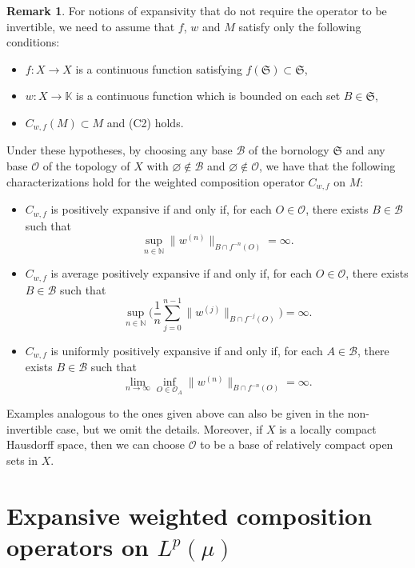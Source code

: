 \documentclass[12pt]{article}
\theoremstyle{plain}
\theoremstyle{definition}
\newtheorem{remark}[theorem]{Remark}%
\newcommand{\N}{\mathbb{N}} %
\newcommand{\K}{\mathbb{K}} %
\newcommand{\cB}{\mathcal{B}}
\newcommand{\cO}{\mathcal{O}}
\newcommand{\fS}{\mathfrak{S}}
\begin{document}
\begin{remark}\label{ExpCX-R1}
For notions of expansivity that do not require the operator to be invertible, 
we need to assume that $f$, $w$ and $M$ satisfy only the following conditions:
\begin{itemize}
\item $f : X \to X$ is a continuous function satisfying $f(\fS) \subset \fS$,
\item $w : X \to \K$ is a continuous function which is bounded on each set $B \in \fS$,
\item $C_{w,f}(M) \subset M$ and (C2) holds.
\end{itemize}
Under these hypotheses, by choosing any base $\cB$ of the bornology $\fS$ and any base $\cO$ of the topology of $X$
with $\varnothing \not\in \cB$ and $\varnothing \not\in \cO$, we have that 
the following characterizations hold for the weighted composition operator $C_{w,f}$ on $M$:

\begin{itemize}
\item [\rm (a)] $C_{w,f}$ is positively expansive if and only if, for each $O \in \cO$, there exists $B \in \cB$ such that
    \[
    \sup_{n \in \N} \|w^{(n)}\|_{B \cap f^{-n}(O)} = \infty.
    \]
\item [\rm (b)] $C_{w,f}$ is average positively expansive if and only if, for each $O \in \cO$, there exists $B \in \cB$ such that
    \[
    \sup_{n \in \N} \Big(\frac{1}{n} \sum_{j=0}^{n-1} \|w^{(j)}\|_{B \cap f^{-j}(O)}\Big) = \infty.
    \]
\item [\rm (c)] $C_{w,f}$ is uniformly positively expansive if and only if, for each $A \in \cB$, there exists $B \in \cB$ such that 
\[
\lim_{n \to \infty} \inf_{O \in \cO_A} \|w^{(n)}\|_{B \cap f^{-n}(O)} = \infty.
\]
\end{itemize}
Examples analogous to the ones given above can also be given in the non-invertible case, but we omit the details. 
Moreover, if $X$ is a locally compact Hausdorff space, then we can choose $\cO$ to be a base of relatively compact open sets in $X$.
\end{remark}


\section{Expansive weighted composition operators on $L^p(\mu)$}\label{S-ExpLp}
\end{document}
